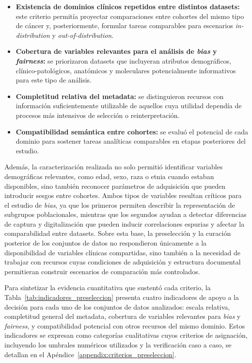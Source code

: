 \begin{itemize}
    \item \textbf{Existencia de dominios clínicos repetidos entre distintos datasets:} este criterio permitía proyectar comparaciones entre cohortes del mismo tipo de cáncer y, posteriormente, formular tareas comparables para escenarios \textit{in-distribution} y \textit{out-of-distribution}.

    \item \textbf{Cobertura de variables relevantes para el análisis de \textit{bias} y \textit{fairness}:} se priorizaron datasets que incluyeran atributos demográficos, clínico-patológicos, anatómicos y moleculares potencialmente informativos para este tipo de análisis.

    \item \textbf{Completitud relativa del metadata:} se distinguieron recursos con información suficientemente utilizable de aquellos cuya utilidad dependía de procesos más intensivos de selección o reinterpretación.

    \item \textbf{Compatibilidad semántica entre cohortes:} se evaluó el potencial de cada dominio para sostener tareas analíticas comparables en etapas posteriores del estudio.
\end{itemize}

Además, la caracterización realizada no solo permitió identificar variables demográficas relevantes, como edad, sexo, raza o etnia cuando estaban disponibles, sino también reconocer parámetros de adquisición que pueden introducir sesgos entre cohortes. Ambos tipos de variables resultan críticos para el estudio de \textit{bias}, ya que los primeros permiten describir la representación de subgrupos poblacionales, mientras que los segundos ayudan a detectar diferencias de captura y digitalización que pueden inducir correlaciones espurias y afectar la comparabilidad entre datasets. Sobre esta base, la preselección y la curación posterior de los conjuntos de datos no respondieron únicamente a la disponibilidad de variables clínicas compartidas, sino también a la necesidad de trabajar con recursos cuyas condiciones de adquisición y estructura documental permitieran construir escenarios de comparación más controlados.

Para sintetizar la evidencia cuantitativa que sustentó cada criterio, la Tabla~\ref{tab:indicadores_preseleccion} presenta cuatro indicadores de apoyo a la decisión para cada uno de los conjuntos de datos analizados: escala relativa, completitud general del metadata, cobertura de variables relevantes para \textit{bias} y \textit{fairness}, y compatibilidad potencial con otros recursos del mismo dominio. Estos indicadores se expresan como categorías cualitativas cuyos criterios de asignación, incluyendo los umbrales numéricos utilizados y la verificación caso a caso, se detallan en el Apéndice~\ref{appendix:criterios_preseleccion}.

